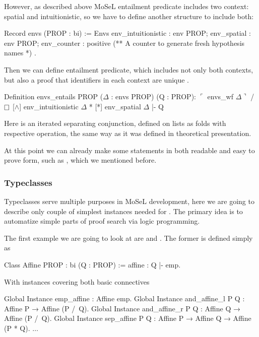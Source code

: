 However, as described above MoSeL entailment predicate includes two context: spatial and intuitionistic, so we have to define another structure to include both:

\begin{coq}
Record envs (PROP : bi) := Envs {
  env_intuitionistic : env PROP;
  env_spatial : env PROP;
  env_counter : positive (** A counter to generate fresh hypothesis names *)
}.
\end{coq}

Then we can define entailment predicate, which includes not only both contexts, but also a proof that identifiers in each context are unique .
\begin{coq}
  Definition envs_entails {PROP} ($\Delta$ : envs PROP) (Q : PROP):
  $\ulcorner$ envs_wf $\Delta \urcorner$ /\ $\mathop{\Box}$ [$\wedge$] env_intuitionistic $\Delta$ * [*] env_spatial $\Delta$ |- Q
\end{coq}

Here \coqe{[*]} is an iterated separating conjunction, defined on lists as folds with respective operation, the same way as it was defined in theoretical presentation.

At this point we can already make some statements in both readable and easy to prove form, such as , which we mentioned before.\\

\subsubsection{Typeclasses}
\label{subsubsec:typeclasses}

Typeclasses serve multiple purposes in MoSeL development, here we are going to describe only couple of simplest instances needed for .
The primary idea is to automatize simple parts of proof search via logic programming.

The first example we are going to look at are  and .
The former is defined simply as
\begin{coq}
Class Affine {PROP : bi} (Q : PROP) := affine : Q |- emp.
\end{coq}

With instances covering both basic connectives
\begin{coq}
Global Instance emp_affine : Affine emp.
Global Instance and_affine_l P Q : Affine P → Affine (P /\ Q).
Global Instance and_affine_r P Q : Affine Q → Affine (P /\ Q).
Global Instance sep_affine P Q : Affine P → Affine Q → Affine (P * Q).
$\ldots$
\end{coq}

